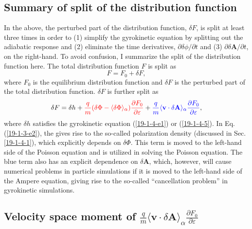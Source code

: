 \documentclass{article}
\newcommand{\tmcolor}[2]{{\color{#1}{#2}}}
\begin{document}
\subsection{Summary of split of the distribution function}

In the above, the perturbed part of the distribution function, $\delta F$, is
split at least three times in order to (1) simplify the gyrokinetic equation
by splitting out the adiabatic response and (2) eliminate the time
derivatives, $\partial \delta \phi / \partial t$ and (3) $\partial \delta
\mathbf{A}/ \partial t$, on the right-hand. To avoid confusion, I summarize
the split of the distribution function here. The total distribution function
$F$ is split as
\begin{equation}
  \label{19-1-4-6} F = F_0 + \delta F,
\end{equation}
where $F_0$ is the equilibrium distribution function and $\delta F$ is the
perturbed part of the total distribution function. $\delta F$ is further split
as
\begin{equation}
  \label{19-1-3-e2} \delta F = \delta h + \tmcolor{red}{\frac{q}{m} (\delta
  \Phi - \langle \delta \Phi \rangle_{\alpha}) \frac{\partial F_0}{\partial
  \varepsilon}} + \tmcolor{blue}{\frac{q}{m} \langle \mathbf{v} \cdot \delta
  \mathbf{A} \rangle_{\alpha} \frac{\partial F_0}{\partial \varepsilon}},
\end{equation}
where $\delta h$ satisfies the gyrokinetic equation (\ref{19-1-4-e1}) or
(\ref{19-1-4-5}). In Eq. (\ref{19-1-3-e2}), the \tmcolor{red}{red term} gives
rise to the so-called polarization density (discussed in Sec. \ref{19-1-4-1}),
which explicitly depends on $\delta \Phi$. This term is moved to the left-hand
side of the Poisson equation and is utilized in solving the Poisson equation.
The blue term also has an explicit dependence on $\delta \mathbf{A}$, which,
however, will cause numerical problems in particle simulations if it is moved
to the left-hand side of the Ampere equation, giving rise to the so-called
``cancellation problem'' in gyrokinetic simulations.

\subsection{Velocity space moment of $\frac{q}{m} \langle \mathbf{v} \cdot
\delta \mathbf{A} \rangle_{\alpha} \frac{\partial F_0}{\partial
\varepsilon}$}\label{19-3-21-8}
\end{document}
